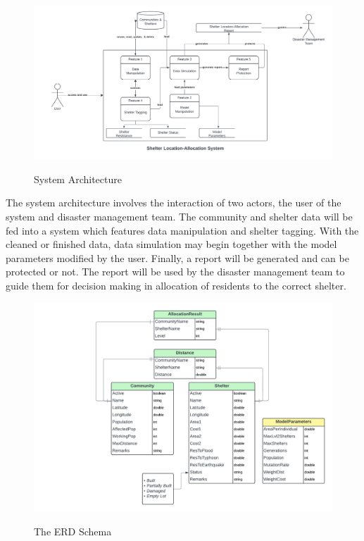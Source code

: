 	\begin{figure}[h!]
		\caption{System Architecture}
		\centering
		\includegraphics[width=\textwidth]{Context Diagram}
		\label{SystemArch}
	\end{figure}
	
	The system architecture involves the interaction of two actors, the user of the system and disaster management team. The community and shelter data will be fed into a system which features data manipulation and shelter tagging. With the cleaned or finished data, data simulation may begin together with the model parameters modified by the user. Finally, a report will be generated and can be protected or not. The report will be used by the disaster management team to guide them for decision making in allocation of residents to the correct shelter.

	\begin{figure}[h!]
		\caption{The ERD Schema}
		\centering
		\includegraphics[width=\textwidth]{ERD}
		\label{ERD}
	\end{figure}
	
